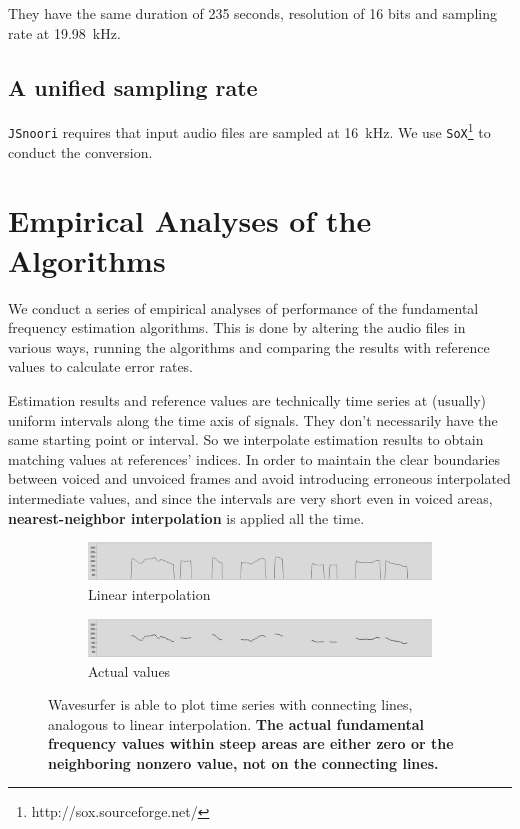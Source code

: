 \documentclass[11pt,a4paper]{report}
\begin{document}
They have the same duration of 235 seconds, resolution of 16 bits and sampling rate at \SI{19.98}{\kilo\hertz}.

\section{A unified sampling rate}

\texttt{JSnoori} requires that input audio files are sampled at \SI{16}{\kilo\hertz}.
We use \texttt{SoX}\footnote{http://sox.sourceforge.net/} to conduct the conversion.

\chapter{Empirical Analyses of the Algorithms} \label{emp-aly}

We conduct a series of empirical analyses of performance of the fundamental frequency estimation algorithms.
This is done by altering the audio files in various ways, running the algorithms and comparing the results with reference values to calculate error rates.

Estimation results and reference values are technically time series at (usually) uniform intervals along the time axis of signals.
They don't necessarily have the same starting point or interval.
So we interpolate estimation results to obtain matching values at references' indices.
In order to maintain the clear boundaries between voiced and unvoiced frames and avoid introducing erroneous interpolated intermediate values, and since the intervals are very short even in voiced areas, \textbf{nearest-neighbor interpolation} is applied all the time.

\begin{figure}[htbp]
  \centering
  \begin{subfigure}{\textwidth}
    \includegraphics[width=\textwidth]{f0s-lp.png}
    \caption{Linear interpolation}
    \label{fig:f0s-lp}
  \end{subfigure}

  \begin{subfigure}{\textwidth}
    \includegraphics[width=\textwidth]{f0s-real.png}
    \caption{Actual values}
    \label{fig:f0s-real}
  \end{subfigure}

  \caption[Data plotting options in Wavesurfer.]{Wavesurfer is able to plot time series with connecting lines, analogous to linear interpolation.
    \textbf{The actual fundamental frequency values within steep areas are either zero or the neighboring nonzero value, not on the connecting lines.}}
  \label{fig:f0s}
\end{figure}
\end{document}
